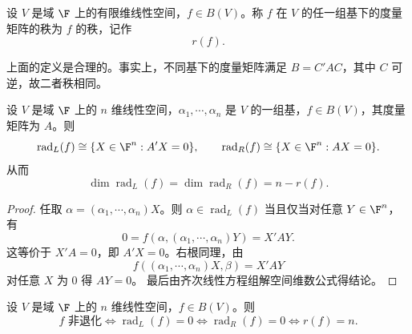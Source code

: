 \begin{definition}[双线性型的秩]\label{p1:concept:c7-l485}
	设 $V$ 是域 $\F$ 上的有限维线性空间，$f\in B(V)$。称 $f$ 在 $V$ 的任一组基下的度量矩阵的秩为 $f$ 的秩，记作
	\[
	r(f).
	\]
\end{definition}

上面的定义是合理的。事实上，不同基下的度量矩阵满足 $B=C'AC$，其中 $C$ 可逆，故二者秩相同。

\begin{lemma}
	设 $V$ 是域 $\F$ 上的 $n$ 维线性空间，$\alpha_1,\cdots,\alpha_n$ 是 $V$ 的一组基，$f\in B(V)$，其度量矩阵为 $A$。则
	\[
	\operatorname{rad}_L(f)\cong \{X\in\F^n:A'X=0\},
	\qquad
	\operatorname{rad}_R(f)\cong \{X\in\F^n:AX=0\}.
	\]
	从而
	\[
	\dim\operatorname{rad}_L(f)=\dim\operatorname{rad}_R(f)=n-r(f).
	\]
\end{lemma}

\begin{proof}
	任取 $\alpha=(\alpha_1,\cdots,\alpha_n)X$。则 $\alpha\in\operatorname{rad}_L(f)$ 当且仅当对任意 $Y\in\F^n$，有
	\[
	0=f(\alpha,(\alpha_1,\cdots,\alpha_n)Y)=X'AY.
	\]
	这等价于 $X'A=0$，即 $A'X=0$。右根同理，由
	\[
	f((\alpha_1,\cdots,\alpha_n)X,\beta)=X'AY
	\]
	对任意 $X$ 为 $0$ 得 $AY=0$。
	最后由齐次线性方程组解空间维数公式得结论。
\end{proof}
\begin{corollary}
	
	设 $V$ 是域 $\F$ 上的 $n$ 维线性空间，$f\in B(V)$。则
	\[
	f\text{ 非退化}
	\Longleftrightarrow
	\operatorname{rad}_L(f)=0
	\Longleftrightarrow
	\operatorname{rad}_R(f)=0
	\Longleftrightarrow
	r(f)=n.
	\]
\end{corollary}


